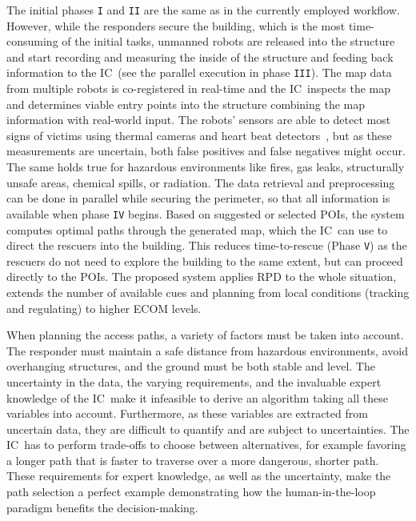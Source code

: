 \documentclass[conference,10pt,letter]{IEEEtran}
\def\IC{IC}
\begin{document}
 The initial phases \texttt{I} and \texttt{II} are the same as in the currently employed workflow. However, while the responders secure the building, which is the most time-consuming of the initial tasks, unmanned robots are released into the structure and start recording and measuring the inside of the structure and feeding back information to the \IC\ (see the parallel execution in phase \texttt{III}). The map data from multiple robots is co-registered in real-time and the \IC\ inspects the map and determines viable entry points into the structure combining the map information with real-world input. The robots' sensors are able to detect most signs of victims using thermal cameras and heart beat detectors~\cite{6027084, Wu12Eulerian}, but as these measurements are uncertain, both false positives and false negatives might occur. The same holds true for hazardous environments like fires, gas leaks, structurally unsafe areas, chemical spills, or radiation. The data retrieval and preprocessing can be done in parallel while securing the perimeter, so that all information is available when phase \texttt{IV} begins. Based on suggested or selected POIs, the system computes optimal paths through the generated map, which the \IC\ can use to direct the rescuers into the building. This reduces time-to-rescue (Phase \texttt{V}) as the rescuers do not need to explore the building to the same extent, but can proceed directly to the POIs. The proposed system applies RPD to the whole situation, extends the number of available cues and planning from local conditions (tracking and regulating) to higher ECOM levels.

When planning the access paths, a variety of factors must be taken into account. The responder must maintain a safe distance from hazardous environments, avoid overhanging structures, and the ground must be both stable and level. The uncertainty in the data, the varying requirements, and the invaluable expert knowledge of the \IC\ make it infeasible to derive an algorithm taking all these variables into account. Furthermore, as these variables are extracted from uncertain data, they are difficult to quantify and are subject to uncertainties. The \IC\ has to perform trade-offs to choose between alternatives, for example favoring a longer path that is faster to traverse over a more dangerous, shorter path. These requirements for expert knowledge, as well as the uncertainty, make the path selection a perfect example demonstrating how the human-in-the-loop paradigm benefits the decision-making.
\end{document}

